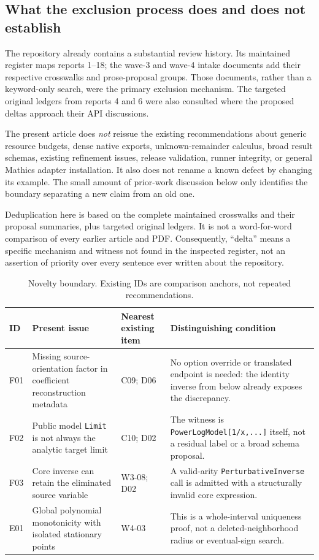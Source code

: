 \documentclass[11pt,letterpaper]{article}
\newcommand{\code}[1]{\nolinkurl{#1}}
\begin{document}
\subsection{What the exclusion process does and does not establish}
The repository already contains a substantial review history. Its maintained register maps reports 1--18; the wave-3 and wave-4 intake documents add their respective crosswalks and prose-proposal groups. Those documents, rather than a keyword-only search, were the primary exclusion mechanism. The targeted original ledgers from reports 4 and 6 were also consulted where the proposed deltas approach their API discussions.\cite{reviewindex,register,wave3,wave4,r4,r6}

The present article does \emph{not} reissue the existing recommendations about generic resource budgets, dense native exports, unknown-remainder calculus, broad result schemas, existing refinement issues, release validation, runner integrity, or general Mathics adapter installation. It also does not rename a known defect by changing its example. The small amount of prior-work discussion below only identifies the boundary separating a new claim from an old one.

Deduplication here is based on the complete maintained crosswalks and their proposal summaries, plus targeted original ledgers. It is not a word-for-word comparison of every earlier article and PDF. Consequently, ``delta'' means a specific mechanism and witness not found in the inspected register, not an assertion of priority over every sentence ever written about the repository.

\begin{table}[htbp]
\small
\begin{tabularx}{\linewidth}{@{}lYYY@{}}
\toprule
ID & Present issue & Nearest existing item & Distinguishing condition\\
\midrule
F01 & Missing source-orientation factor in coefficient reconstruction metadata & C09; D06 & No option override or translated endpoint is needed: the identity inverse from below already exposes the discrepancy.\\
F02 & Public model \code{Limit} is not always the analytic target limit & C10; D02 & The witness is \code{PowerLogModel[1/x,...]} itself, not a residual label or a broad schema proposal.\\
F03 & Core inverse can retain the eliminated source variable & W3-08; D02 & A valid-arity \code{PerturbativeInverse} call is admitted with a structurally invalid core expression.\\
E01 & Global polynomial monotonicity with isolated stationary points & W4-03 & This is a whole-interval uniqueness proof, not a deleted-neighborhood radius or eventual-sign search.\\
\bottomrule
\end{tabularx}
\caption{Novelty boundary. Existing IDs are comparison anchors, not repeated recommendations.}
\end{table}
\end{document}
